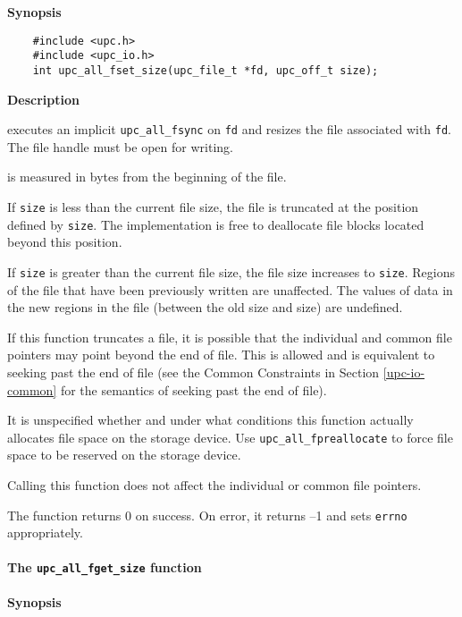{\bf Synopsis}

\npf\vspace{-2.5em} 

\begin{verbatim}
    #include <upc.h>
    #include <upc_io.h>
    int upc_all_fset_size(upc_file_t *fd, upc_off_t size);
\end{verbatim}

{\bf Description}

 executes an implicit {\tt upc\_all\_fsync} on {\tt fd} and
resizes the file associated with {\tt fd}. The file handle must be open for writing.

 is measured in bytes from the beginning of the file.

\np If {\tt size} is less than the current file size, the file is truncated at the
position defined by {\tt size}. The implementation is free to deallocate file
blocks located beyond this position.

\np If {\tt size} is greater than the current file size, the file size increases to
{\tt size}. Regions of the file that have been previously written are unaffected.
The values of data in the new regions in the file (between the old size and
size) are undefined.

\np If this function truncates a file, it is possible that the individual and
common file pointers may point beyond the end of file. This is allowed and is
equivalent to seeking past the end of file (see the Common Constraints in Section
\ref{upc-io-common} for the semantics of seeking past the end of file).

\np It is unspecified whether and under what conditions this function 
actually allocates file space on the storage device.
Use {\tt upc\_all\_fpreallocate} to force file space to be reserved on the storage device.

\np Calling this function does not affect the individual or common file pointers.

\np The function returns 0 on success. On error, it returns --1 and sets {\tt errno}
appropriately.

\paragraph{The {\tt upc\_all\_fget\_size} function}

{\bf Synopsis}

